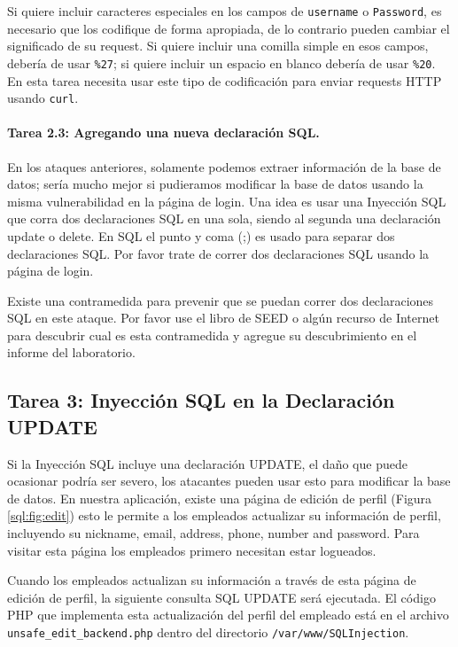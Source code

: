 Si quiere incluir caracteres especiales en los campos de \texttt{username} o \texttt{Password}, es necesario que los codifique de forma apropiada, de lo contrario pueden cambiar el significado de su request. Si quiere incluir una comilla simple en esos campos, debería de usar \texttt{\%27}; si quiere incluir un espacio en blanco debería de usar \texttt{\%20}. En esta tarea necesita usar este tipo de codificación para enviar requests HTTP usando \texttt{curl}.


\paragraph{Tarea 2.3: Agregando una nueva declaración SQL.} 
En los ataques anteriores, solamente podemos extraer información de la base de datos; sería mucho mejor si pudieramos modificar la base de datos usando la misma vulnerabilidad en la página de login. Una idea es usar una Inyección SQL que corra dos declaraciones SQL en una sola, siendo al segunda una declaración update o delete. En SQL el punto y coma (;) es usado para separar dos declaraciones SQL. Por favor trate de correr dos declaraciones SQL usando la página de login.

Existe una contramedida para prevenir que se puedan correr dos declaraciones SQL en este ataque. Por favor use el libro de SEED o algún recurso de Internet para descubrir cual es esta contramedida y agregue su descubrimiento en el informe del laboratorio.


\subsection{Tarea 3: Inyección SQL en la Declaración UPDATE} 

Si la Inyección SQL incluye una declaración UPDATE, el daño que puede ocasionar podría ser severo, los atacantes pueden usar esto para modificar la base de datos.
En nuestra aplicación, existe una página de edición de perfil (Figura    \ref{sql:fig:edit}) esto le permite a los empleados actualizar su información de perfil, incluyendo su nickname, email, address, phone, number and password. Para visitar esta página los empleados primero necesitan estar logueados.

Cuando los empleados actualizan su información a través de esta página de edición de perfil, la siguiente consulta SQL UPDATE será ejecutada. El código PHP que implementa esta actualización del perfil del empleado está en el archivo {\tt unsafe\_edit\_backend.php} dentro del directorio {\tt /var/www/SQLInjection}.


